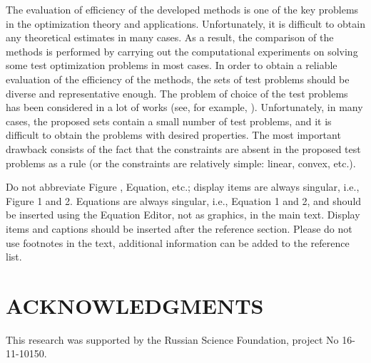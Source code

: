 \documentclass{aip-cp}
\begin{document}
The evaluation of efficiency of the developed methods is one of the key problems in the optimization theory and applications. Unfortunately, it is difficult to obtain any theoretical estimates in many cases. As a result, the comparison of the methods is performed by carrying out the computational experiments on solving some test optimization problems in most cases. In order to obtain a reliable evaluation of the efficiency of the methods, the sets of test problems should be diverse and representative enough. The problem of choice of the test problems has been considered in a lot of works (see, for example, \cite{Floudas1999}). Unfortunately, in many cases, the proposed sets contain a small number of test problems, and it is difficult to obtain the problems with desired properties. The most important drawback consists of the fact that the constraints are absent in the proposed test problems as a rule (or the constraints are relatively simple: linear, convex, etc.).



Do not abbreviate Figure , Equation, etc.; display items are always singular, i.e., Figure 1 and 2. Equations are always singular, i.e., Equation 1 and 2, and should be inserted using the Equation Editor, not as graphics, in the main text.  Display items and captions should be inserted after the reference section. Please do not use footnotes in the text, additional information can be added to the reference list.


\section{ACKNOWLEDGMENTS}
This research was supported by the Russian Science Foundation, project No 16-11-10150.


\nocite{*}
%
%
\end{document}
